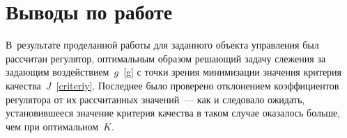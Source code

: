 \newpage

\section{Выводы по работе}
В~результате проделанной работы для заданного объекта управления был рассчитан регулятор, оптимальным образом решающий задачу слежения за задающим воздействием~$g$~\eqref{g} с точки зрения минимизации значения критерия качества~$J$~\eqref{criteriy}. Последнее было проверено отклонением коэффициентов регулятора от их рассчитанных значений~--- как и следовало ожидать, установившееся значение критерия качества в таком случае оказалось больше, чем при оптимальном~$K$.
